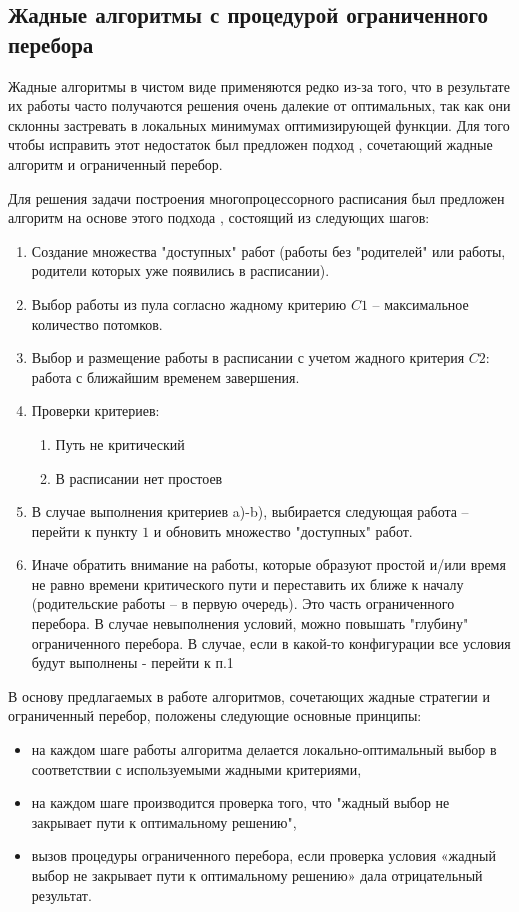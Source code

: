 \documentclass{article}
\begin{document}
\subsection{Жадные алгоритмы с процедурой ограниченного перебора}
Жадные алгоритмы в чистом  виде применяются редко из-за того, что в результате их работы часто получаются решения очень далекие от оптимальных, так как они склонны застревать в локальных минимумах оптимизирующей функции. Для того чтобы исправить этот недостаток был предложен подход \cite{Kostenko_2017}, сочетающий жадные алгоритм и ограниченный перебор. \par
Для решения задачи построения многопроцессорного расписания был предложен алгоритм на основе этого подхода \cite{Kostenko_2017}, состоящий из следующих шагов:
\begin{enumerate}
  \item Создание множества "доступных" работ (работы без "родителей" или работы, родители которых уже появились в расписании).
  \item Выбор работы из пула согласно жадному критерию $C1$ – максимальное количество потомков.
  \item Выбор и размещение работы в расписании с учетом жадного критерия $C2$: работа с ближайшим временем завершения.
  \item Проверки критериев:
        \begin{enumerate}
          \item Путь не критический
          \item В расписании нет простоев
        \end{enumerate}
  \item В случае выполнения критериев a)-b), выбирается следующая работа – перейти к пункту $1$ и обновить множество "доступных" работ.
  \item Иначе обратить внимание на работы, которые образуют простой и/или время не равно времени критического пути и переставить их ближе к началу (родительские работы – в первую очередь). Это часть ограниченного перебора. В случае невыполнения условий, можно повышать "глубину" ограниченного перебора. В случае, если в какой-то конфигурации все условия будут выполнены - перейти к п.1
\end{enumerate}
В основу предлагаемых в работе алгоритмов, сочетающих жадные стратегии и ограниченный перебор, положены следующие основные принципы:
\begin{itemize}
  \item на каждом шаге работы алгоритма делается локально-оптимальный выбор в соответствии с используемыми жадными критериями,
  \item на каждом шаге производится проверка того, что "жадный выбор не закрывает пути к оптимальному решению",
  \item вызов процедуры ограниченного перебора, если проверка условия «жадный выбор не закрывает пути к оптимальному решению» дала отрицательный результат.
\end{itemize}
\end{document}
